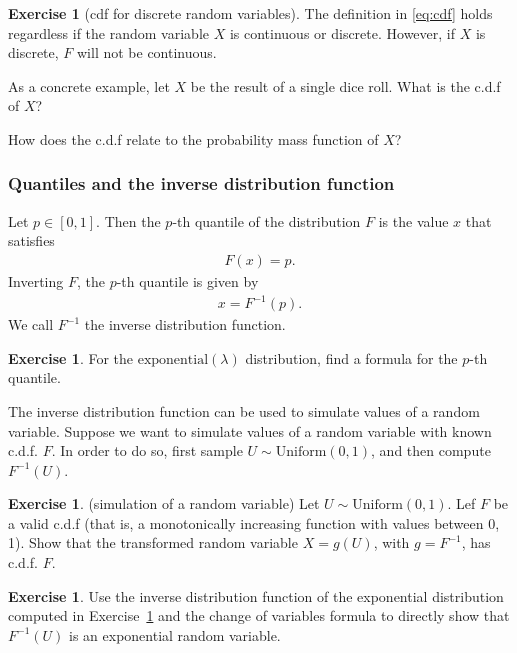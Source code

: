 \documentclass[11pt]{article}
\theoremstyle{definition}
\newtheorem{exercise}[]{Exercise}
\begin{document}
\begin{exercise}[cdf for discrete random variables]
  The definition in \eqref{eq:cdf} holds
  regardless if the random variable $X$ is continuous
  or discrete. However, if $X$ is discrete, $F$
  will not be continuous.

  As a concrete example, let $X$ be the result of a
  single dice roll. What is the c.d.f of $X$?

  How does the c.d.f relate to the probability mass
  function of $X$?

\end{exercise}


\subsubsection*{Quantiles and
the inverse distribution function}

Let $p\in[0, 1]$. Then the $p$-th quantile of
the distribution $F$ is the value $x$ that
satisfies
\begin{align*}
  F(x) = p.
\end{align*}
Inverting $F$, the $p$-th quantile is given by
\begin{align*}
  x = F^{-1}(p).
\end{align*}
We call $F^{-1}$ the inverse distribution function.

\begin{exercise}
  For the $\text{exponential}(\lambda)$ distribution,
  find a formula for the $p$-th quantile.
  \label{ex:exp_inv_cdf}
\end{exercise}

The inverse distribution function can be used to
simulate values of a random variable.
Suppose we want to simulate values of a random variable
with known c.d.f. $F$.
In order to do so, first sample $U\sim\text{Uniform}(0, 1)$, and then compute $F^{-1}(U)$.

\begin{exercise}(simulation of a random variable)
Let $U\sim\text{Uniform}(0, 1)$.
Lef $F$ be a valid c.d.f
(that is, a monotonically increasing function
with values between 0, 1). Show that
the transformed random variable $X = g(U)$,
with $g = F^{-1}$, has c.d.f. $F$.
\end{exercise}

\begin{exercise}
  Use the inverse distribution function of
  the exponential distribution computed in
  Exercise~\ref{ex:exp_inv_cdf} and the change of
  variables formula to directly show that
  $F^{-1}(U)$ is an exponential random variable.
\end{exercise}
\end{document}
